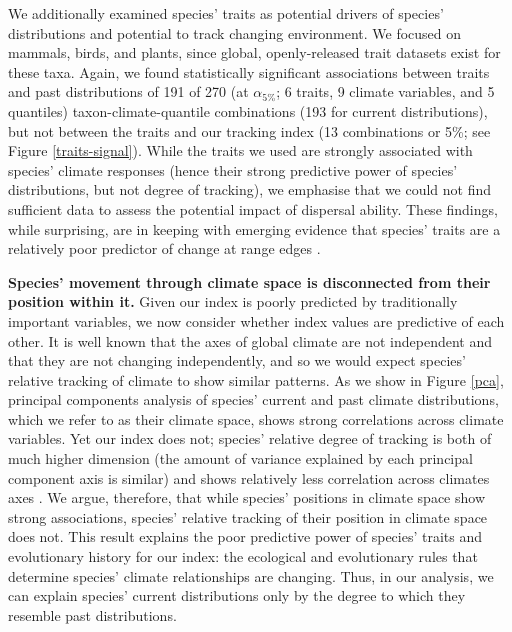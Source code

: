 \documentclass[12pt]{report}
\begin{document}
We additionally examined species' traits as potential drivers of
species' distributions and potential to track changing environment. We
focused on mammals, birds, and plants, since global, openly-released
trait datasets exist for these taxa. Again, we found statistically
significant associations between traits and past distributions of 191
of 270 (at $\alpha_{5\%}$; 6 traits, 9 climate variables, and 5
quantiles) taxon-climate-quantile combinations (193 for current
distributions), but not between the traits and our tracking index (13
combinations or 5\%; see Figure \ref{traits-signal}). While the traits
we used are strongly associated with species' climate
responses\supercite{Wright2004,McCain2014} (hence their strong
predictive power of species' distributions, but not degree of
tracking), we emphasise that we could not find sufficient data to
assess the potential impact of dispersal
ability\supercite{Schloss2012}. These findings, while surprising, are
in keeping with emerging evidence that species' traits are a
relatively poor predictor of change at range edges
\supercite{Angert2011}.

\textbf{Species' movement through climate space is disconnected from
  their position within it.} Given our index is poorly predicted by
traditionally important variables, we now consider whether index
values are predictive of each other. It is well known that the axes of
global climate are not independent and that they are not changing
independently\supercite{Harris2014,IPCC2014}, and so we would expect
species' relative tracking of climate to show similar patterns. As we
show in Figure \ref{pca}, principal components analysis of species'
current and past climate distributions, which we refer to as their
climate space, shows strong correlations across climate variables. Yet
our index does not; species' relative degree of tracking is both of
much higher dimension (the amount of variance explained by each
principal component axis is similar) and shows relatively less
correlation across climates axes . We argue, therefore, that while
species' positions in climate space show strong associations, species'
relative tracking of their position in climate space does not. This
result explains the poor predictive power of species' traits and
evolutionary history for our index: the ecological and evolutionary
rules that determine species' climate relationships are
changing. Thus, in our analysis, we can explain species' current
distributions only by the degree to which they resemble past
distributions.
\end{document}
